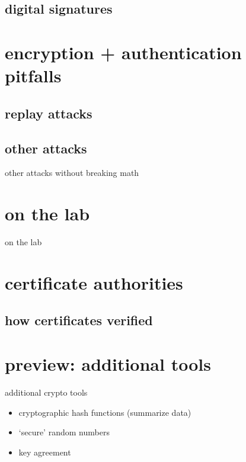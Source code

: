 

\subsection{digital signatures}



\section{encryption + authentication pitfalls}



\subsection{replay attacks}




\subsection{other attacks}

\begin{frame}{other attacks without breaking math}
\end{frame}



\section{on the lab}
\begin{frame}{on the lab}
\end{frame}

\section{certificate authorities}



\subsection{how certificates verified}


\section{preview: additional tools}
\begin{frame}{additional crypto tools}
    \begin{itemize}
    \item cryptographic hash functions (summarize data)
    \item `secure' random numbers
    \item key agreement
    \end{itemize}
\end{frame}

